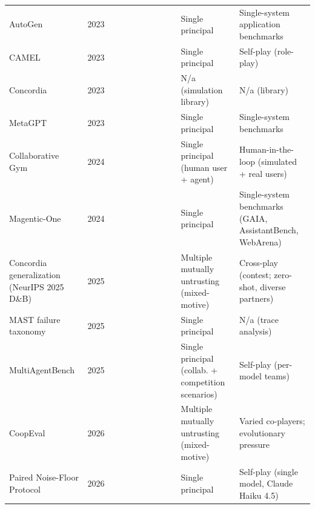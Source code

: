 \documentclass[conference]{IEEEtran}
\newcommand{\full}{{\small\CIRCLE}}
\newcommand{\half}{{\small\LEFTcircle}}
\newcommand{\none}{{\small\Circle}}
\begin{document}
{\begin{longtable}{>{\raggedright\arraybackslash}p{4.2cm} c cccccccc >{\raggedright\arraybackslash}p{3.6cm} >{\raggedright\arraybackslash}p{4.4cm}}
AutoGen \cite{wu2023autogen} & 2023 & \none{} & \none{} & \none{} & \none{} & \none{} & \half{} & \none{} & \none{} & Single principal & Single-system application benchmarks \\
CAMEL \cite{li2023camel} & 2023 & \none{} & \none{} & \none{} & \none{} & \none{} & \none{} & \none{} & \none{} & Single principal & Self-play (role-play) \\
Concordia \cite{vezhnevets2023concordia} & 2023 & \none{} & \none{} & \none{} & \none{} & \half{} & \none{} & \none{} & \none{} & N/a (simulation library) & N/a (library) \\
MetaGPT \cite{hong2023metagpt} & 2023 & \none{} & \none{} & \none{} & \none{} & \none{} & \none{} & \none{} & \none{} & Single principal & Single-system benchmarks \\
Collaborative Gym \cite{shao2024cogym} & 2024 & \full{} & \none{} & \none{} & \none{} & \none{} & \half{} & \none{} & \none{} & Single principal (human user + agent) & Human-in-the-loop (simulated + real users) \\
Magentic-One \cite{fourney2024magenticone} & 2024 & \none{} & \none{} & \none{} & \none{} & \none{} & \none{} & \none{} & \none{} & Single principal & Single-system benchmarks (GAIA, AssistantBench, WebArena) \\
Concordia generalization (NeurIPS 2025 D\&B) \cite{smith2025concordiagen} & 2025 & \full{} & \none{} & \half{} & \none{} & \none{} & \none{} & \none{} & \half{} & Multiple mutually untrusting (mixed-motive) & Cross-play (contest; zero-shot, diverse partners) \\
MAST failure taxonomy \cite{cemri2025mast} & 2025 & \none{} & \none{} & \none{} & \none{} & \half{} & \none{} & \none{} & \none{} & Single principal & N/a (trace analysis) \\
MultiAgentBench \cite{zhu2025multiagentbench} & 2025 & \none{} & \none{} & \none{} & \none{} & \none{} & \none{} & \none{} & \none{} & Single principal (collab. + competition scenarios) & Self-play (per-model teams) \\
CoopEval \cite{tewolde2026coopeval} & 2026 & \half{} & \none{} & \half{} & \none{} & \half{} & \none{} & \none{} & \half{} & Multiple mutually untrusting (mixed-motive) & Varied co-players; evolutionary pressure \\
Paired Noise-Floor Protocol \cite{kaliyev2026noisefloor} & 2026 & \none{} & \none{} & \none{} & \none{} & \none{} & \none{} & \none{} & \none{} & Single principal & Self-play (single model, Claude Haiku 4.5) \\

\end{longtable}}
\end{document}
